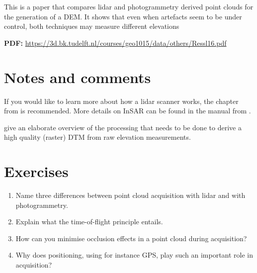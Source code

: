 \begin{kaobox}[frametitle=\faExternalLink\ To read or to watch.]
This is a paper that compares lidar and photogrammetry derived point clouds for the generation of a DEM\@. It shows that even when artefacts seem to be under control, both techniques may measure different elevations 

\textbf{PDF:} \url{https://3d.bk.tudelft.nl/courses/geo1015/data/others/Ressl16.pdf}
\end{kaobox}







%
\section{Notes and comments}
If you would like to learn more about how a lidar scanner works, the chapter from \citet{Chazette16} is recommended.
More details on InSAR can be found in the manual from \citet{ESA07}.

\citet{Reuter09} give an elaborate overview of the processing that needs to be done to derive a high quality (raster) DTM from raw elevation measurements.


%
\section{Exercises}

\begin{enumerate}
	\item Name three differences between point cloud acquisition with lidar and with photogrammetry.
	\item Explain what the time-of-flight principle entails.
	\item How can you minimise occlusion effects in a point cloud during acquisition?
	\item Why does positioning, using for instance GPS, play such an important role in acquisition?
\end{enumerate}
